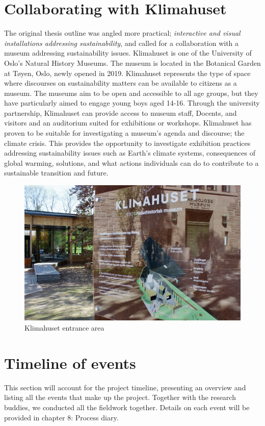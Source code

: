 \section{Collaborating with Klimahuset}
The original thesis outline was angled more practical; \emph{interactive and visual installations addressing sustainability}, and called for a collaboration with a museum addressing sustainability issues. Klimahuset is one of the University of Oslo's Natural History Museums. The museum is located in the Botanical Garden at Tøyen, Oslo, newly opened in 2019. Klimahuset represents the type of space where discourses on sustainability matters can be available to citizens as a museum. The museums aim to be open and accessible to all age groups, but they have particularly aimed to engage young boys aged 14-16. Through the university partnership, Klimahuset can provide access to museum staff, Docents, and visitors and an auditorium suited for exhibitions or workshops. Klimahuset has proven to be suitable for investigating a museum's agenda and discourse; the climate crisis. This provides the opportunity to investigate exhibition practices addressing sustainability issues such as Earth’s climate systems, consequences of global warming, solutions, and what actions individuals can do to contribute to a sustainable transition and future. 

\begin{figure}[H]
\includegraphics[width=12cm]{pictures/klimahuset/klimahuset_info.JPG}
\caption{Klimahuset entrance area}
\centering 
\end{figure}

\section{Timeline of events}
This section will account for the project timeline, presenting an overview and listing all the events that make up the project. Together with the research buddies, we conducted all the fieldwork together. Details on each event will be provided in chapter 8: Process diary.

